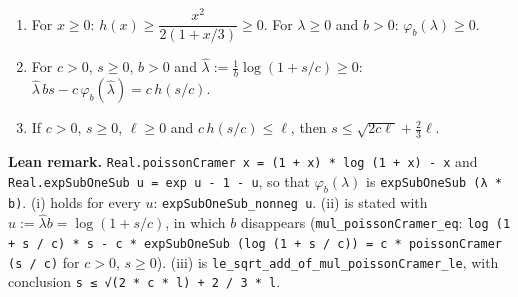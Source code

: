\begin{lemma}\label{lem:poisson_cramer}
\leanok
\begin{enumerate}
\item[(i)] For $x \ge 0$: $h(x) \ge \dfrac{x^2}{2(1 + x/3)} \ge 0$. For $\lambda \ge 0$ and $b > 0$:
  $\varphi_b(\lambda) \ge 0$.
\item[(ii)] For $c > 0$, $s \ge 0$, $b > 0$ and $\hat\lambda := \frac1b \log(1 + s/c) \ge 0$:
  $\hat\lambda\, b s - c\, \varphi_b(\hat\lambda) = c\, h(s/c)$.
\item[(iii)] If $c > 0$, $s \ge 0$, $\ell \ge 0$ and $c\, h(s/c) \le \ell$, then
  $s \le \sqrt{2 c \ell} + \frac23 \ell$.
\end{enumerate}
\end{lemma}

\textbf{Lean remark.} \texttt{Real.poissonCramer x = (1 + x) * log (1 + x) - x} and
\texttt{Real.expSubOneSub u = exp u - 1 - u}, so that $\varphi_b(\lambda)$ is
\texttt{expSubOneSub (λ * b)}. (i) holds for every $u$: \texttt{expSubOneSub\_nonneg u}. (ii) is
stated with $u := \hat\lambda b = \log(1 + s/c)$, in which $b$ disappears
(\texttt{mul\_poissonCramer\_eq}: \texttt{log (1 + s / c) * s - c * expSubOneSub (log (1 + s / c)) =
c * poissonCramer (s / c)} for $c > 0$, $s \ge 0$). (iii) is
\texttt{le\_sqrt\_add\_of\_mul\_poissonCramer\_le}, with conclusion \texttt{s ≤ √(2 * c * l) + 2 / 3 * l}.

